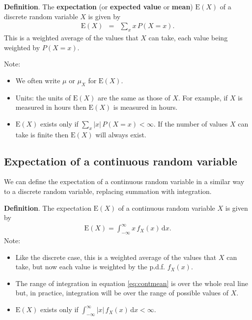 \documentclass[
  british,
]{book}
\providecommand{\tightlist}{%
  \setlength{\itemsep}{0pt}\setlength{\parskip}{0pt}}
\begin{document}
\textbf{Definition}. The \textbf{expectation} (or \textbf{expected value} or \textbf{mean}) \(\mathrm{E}(X)\) of a discrete random variable \(X\) is given by
\begin{eqnarray}
\mathrm{E}(X) &=& \sum_x x\,P(X=x). 
\label{eq:discmean}
\end{eqnarray}
This is a weighted average of the values that \(X\) can take, each value being weighted by \(P(X=x)\).

Note:

\begin{itemize}
\tightlist
\item
  We often write \(\mu\) or \(\mu_X\) for \(\mathrm{E}(X)\).
\item
  Units: the units of \(\mathrm{E}(X)\) are the same as those of \(X\). For example, if \(X\) is measured in hours then \(\mathrm{E}(X)\) is measured in hours.
\item
  \(\mathrm{E}(X)\) exists only if \(\sum_x |x|\,P(X=x) < \infty\). If the number of values \(X\) can take is finite then \(\mathrm{E}(X)\) will always exist.
\end{itemize}

\hypertarget{expectation-of-a-continuous-random-variable}{%
\subsection{Expectation of a continuous random variable}\label{expectation-of-a-continuous-random-variable}}

We can define the expectation of a continuous random variable in a similar way to a discrete random variable, replacing summation with integration.

\textbf{Definition}.
The expectation \(\mathrm{E}(X)\) of a continuous random variable \(X\) is given by
\begin{eqnarray}
\mathrm{E}(X) = \int_{-\infty}^{\infty} x\,f_X(x) \,\mathrm{d}x. 
\label{eq:contmean}
\end{eqnarray}
Note:

\begin{itemize}
\tightlist
\item
  Like the discrete case, this is a weighted average of the values that \(X\) can take, but now each value is weighted by the
  p.d.f. \(f_X(x)\).
\item
  The range of integration in equation \eqref{eq:contmean} is over the whole real line but, in practice, integration will be over the range of possible values of \(X\).
\item
  \(\mathrm{E}(X)\) exists only if \(\int_{-\infty}^{\infty} |x|\,f_X(x) \,\mathrm{d}x < \infty\).
\end{itemize}
\end{document}
